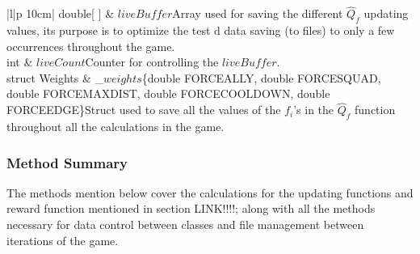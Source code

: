 \begin{centering}
\begin{table}[H]
\begin{tabular}{|l|p {10cm}|}
 	\hline
 	double[ ] &  $liveBuffer$\linebreak  Array used for saving the different $\hat{Q}_f$ updating values, its purpose is to optimize the test d data saving (to files) to only a few occurrences throughout the game. \\
 	\hline
 	int &  $liveCount$\linebreak  Counter for controlling the $liveBuffer$.\\
 	\hline
 	struct Weights & \_$weights$\{double FORCEALLY, double FORCESQUAD, double FORCEMAXDIST, double FORCECOOLDOWN, double FORCEEDGE\}\linebreak  Struct used to save all the values of the $f_i$'s in the $\hat{Q}_f$ function throughout all the calculations in the game. \\
 	\hline
\end{tabular}
\end{table}
\end{centering}

\pagebreak
\subsubsection{Method Summary}

The methods mention below cover the calculations for the updating functions and reward function mentioned in section LINK!!!!; along with all the methods necessary for data control between classes and file management between iterations of the game. 


